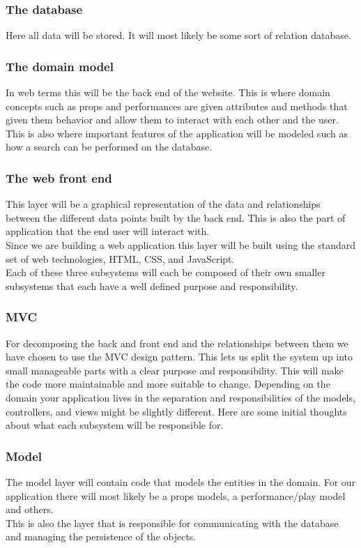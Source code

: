 \documentclass[12pt]{article}
\begin{document}
\subsubsection{The database}
Here all data will be stored. It will most likely be some sort of relation database.
\subsubsection{The domain model}
In web terms this will be the back end of the website. This is where domain
concepts such as props and performances are given attributes and methods that
given them behavior and allow them to interact with each other and the user.
This is also where important features of the application will be modeled such as
how a search can be performed on the database.
\subsubsection{The web front end}
This layer will be a graphical representation of the data and relationships
between the different data points built by the back end. This is also the part
of application that the end user will interact with. \\
Since we are building a web application this layer will be built using the
standard set of web technologies, HTML, CSS, and JavaScript.\\
Each of these three subsystems will each be composed of their own smaller
subsystems that each have a well defined purpose and responsibility.
\subsubsection{MVC}
For decomposing the back and front end and the relationships between them we
have chosen to use the MVC design pattern. This lets us split the system up into
small manageable parts with a clear purpose and responsibility. This will make
the code more maintainable and more suitable to change.
Depending on the domain your application lives in the separation and
responsibilities of the models, controllers, and views might be slightly
different. Here are some initial thoughts about what each subsystem will be
responsible for.
\subsubsection{Model}
The model layer will contain code that models the entities in the domain. For
our application there will most likely be a props models, a performance/play
model and others.\\
This is also the layer that is responsible for communicating with the database
and managing the persistence of the objects.
\end{document}
